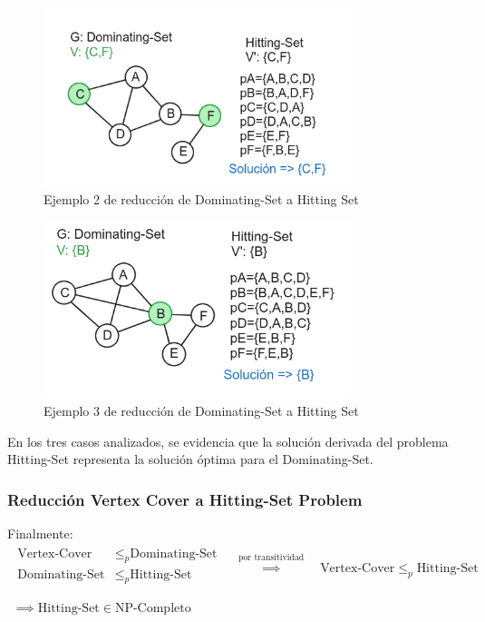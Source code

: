 \begin{figure}[H]
    \centering
    \includegraphics[width=0.8\textwidth]{img/ejemplo2_DS-HS.png}
    \caption{Ejemplo 2 de reducción de Dominating-Set a Hitting Set}
    \label{fig:ejemplo2_DS-HS}
\end{figure}


\begin{figure}[H]
    \centering
    \includegraphics[width=0.8\textwidth]{img/ejemplo3_DS-HS.png}
    \caption{Ejemplo 3 de reducción de Dominating-Set a Hitting Set}
    \label{fig:ejemplo3_DS-HS}
\end{figure}

En los tres casos analizados, se evidencia que la solución derivada del problema Hitting-Set representa la solución óptima para el Dominating-Set.

\subsubsection{Reducción Vertex Cover a Hitting-Set Problem}
Finalmente:
\[
    \begin{array}{c}
        \begin{split}
            \text{Vertex-Cover}  & \leq _{p} \text{Dominating-Set} \\
            \text{Dominating-Set}  & \leq _{p} \text{Hitting-Set} \\
        \end{split}
        \quad \overset{ \text{por transitividad} }{ \implies  } \quad
        \text{Vertex-Cover}  \leq _{p} \text{Hitting-Set} \\ \\
        \implies \text{Hitting-Set} \in \text{NP-Completo}    
    \end{array}
\]


